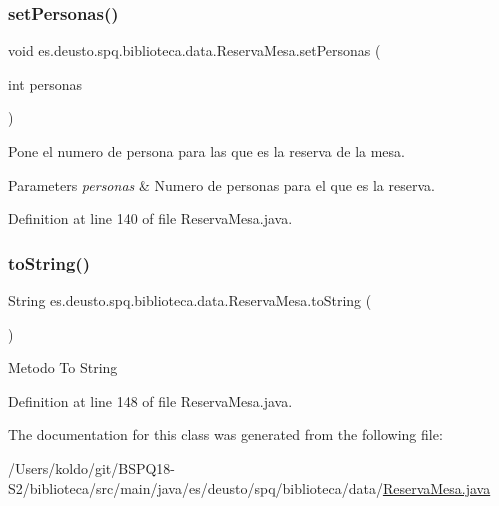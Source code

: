\subsubsection{\texorpdfstring{set\+Personas()}{setPersonas()}}
{\footnotesize\ttfamily void es.\+deusto.\+spq.\+biblioteca.\+data.\+Reserva\+Mesa.\+set\+Personas (\begin{DoxyParamCaption}\item[{int}]{personas }\end{DoxyParamCaption})}

Pone el numero de persona para las que es la reserva de la mesa. 
\begin{DoxyParams}{Parameters}
{\em personas} & Numero de personas para el que es la reserva. \\
\hline
\end{DoxyParams}


Definition at line 140 of file Reserva\+Mesa.\+java.

\mbox{\label{classes_1_1deusto_1_1spq_1_1biblioteca_1_1data_1_1_reserva_mesa_a01e0cd01cb0b967cf11b9d2da905a8db}} 
\subsubsection{\texorpdfstring{to\+String()}{toString()}}
{\footnotesize\ttfamily String es.\+deusto.\+spq.\+biblioteca.\+data.\+Reserva\+Mesa.\+to\+String (\begin{DoxyParamCaption}{ }\end{DoxyParamCaption})}

Metodo To String 

Definition at line 148 of file Reserva\+Mesa.\+java.



The documentation for this class was generated from the following file\+:\begin{DoxyCompactItemize}
\item 
/\+Users/koldo/git/\+B\+S\+P\+Q18-\/\+S2/biblioteca/src/main/java/es/deusto/spq/biblioteca/data/\mbox{\hyperlink{_reserva_mesa_8java}{Reserva\+Mesa.\+java}}\end{DoxyCompactItemize}
